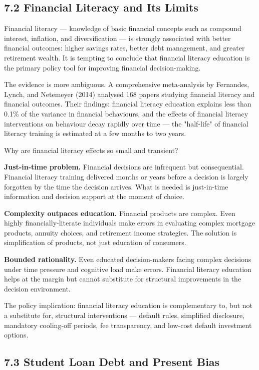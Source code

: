 \documentclass[12pt, letterpaper]{article}
\begin{document}
\subsection{7.2 Financial Literacy and Its Limits}


Financial literacy --- knowledge of basic financial concepts such as compound interest, inflation, and diversification --- is strongly associated with better financial outcomes: higher savings rates, better debt management, and greater retirement wealth. It is tempting to conclude that financial literacy education is the primary policy tool for improving financial decision-making.

The evidence is more ambiguous. A comprehensive meta-analysis by Fernandes, Lynch, and Netemeyer (2014) analysed 168 papers studying financial literacy and financial outcomes. Their findings: financial literacy education explains less than 0.1\% of the variance in financial behaviours, and the effects of financial literacy interventions on behaviour decay rapidly over time --- the "half-life" of financial literacy training is estimated at a few months to two years.

Why are financial literacy effects so small and transient?

\textbf{Just-in-time problem.} Financial decisions are infrequent but consequential. Financial literacy training delivered months or years before a decision is largely forgotten by the time the decision arrives. What is needed is just-in-time information and decision support at the moment of choice.

\textbf{Complexity outpaces education.} Financial products are complex. Even highly financially-literate individuals make errors in evaluating complex mortgage products, annuity choices, and retirement income strategies. The solution is simplification of products, not just education of consumers.

\textbf{Bounded rationality.} Even educated decision-makers facing complex decisions under time pressure and cognitive load make errors. Financial literacy education helps at the margin but cannot substitute for structural improvements in the decision environment.

The policy implication: financial literacy education is complementary to, but not a substitute for, structural interventions --- default rules, simplified disclosure, mandatory cooling-off periods, fee transparency, and low-cost default investment options.


\subsection{7.3 Student Loan Debt and Present Bias}
\end{document}
